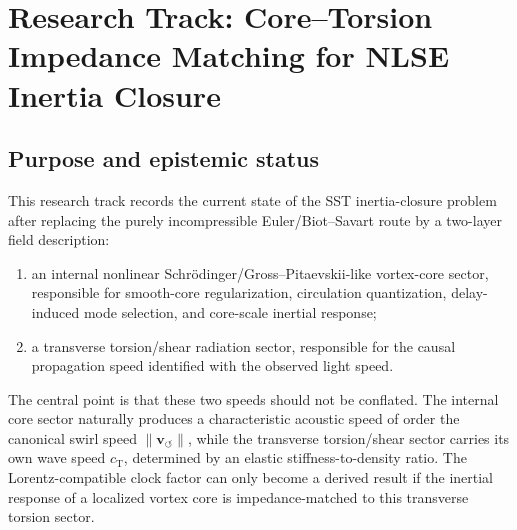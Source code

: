 
\providecommand{\vswirl}{\mathbf{v}_{\!\boldsymbol{\circlearrowleft}}}
\providecommand{\rc}{r_c}
\providecommand{\rhoF}{\rho_{\!f}}
\providecommand{\rhoE}{\rho_{\!E}}
\providecommand{\rhoM}{\rho_{\!m}}
\providecommand{\rhocore}{\rho_{\mathrm{core}}}
\providecommand{\GammaSST}{\Gamma_0}
\providecommand{\ct}{c_{\mathrm{T}}}
\providecommand{\clight}{c_{\mathrm{light}}}
\providecommand{\cs}{c_s}
\providecommand{\xih}{\xi}
\providecommand{\NLS}{\mathrm{NLS}}
\providecommand{\eff}{\mathrm{eff}}
\providecommand{\core}{\mathrm{core}}
\providecommand{\torsion}{\mathrm{torsion}}
\providecommand{\add}{\mathrm{add}}
\providecommand{\diag}{\mathrm{diag}}
\providecommand{\status}[1]{\textbf{[#1]}}

\section{Research Track: Core--Torsion Impedance Matching for NLSE Inertia Closure}
\label{sec:research-core-torsion-impedance}

\subsection{Purpose and epistemic status}
\label{subsec:ctim-purpose-status}

This research track records the current state of the SST inertia-closure problem after replacing the purely incompressible Euler/Biot--Savart route by a two-layer field description:
\begin{enumerate}
    \item an internal nonlinear Schrödinger/Gross--Pitaevskii-like vortex-core sector, responsible for smooth-core regularization, circulation quantization, delay-induced mode selection, and core-scale inertial response;
    \item a transverse torsion/shear radiation sector, responsible for the causal propagation speed identified with the observed light speed.
\end{enumerate}
The central point is that these two speeds should not be conflated.  The internal core sector naturally produces a characteristic acoustic speed of order the canonical swirl speed \(\lVert\vswirl\rVert\), while the transverse torsion/shear sector carries its own wave speed \(\ct\), determined by an elastic stiffness-to-density ratio.  The Lorentz-compatible clock factor can only become a derived result if the inertial response of a localized vortex core is impedance-matched to this transverse torsion sector.

